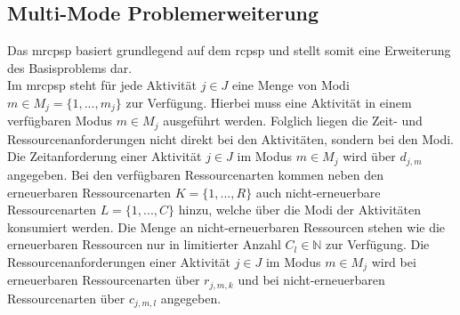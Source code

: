 \subsection{Multi-Mode Problemerweiterung} \label{subsec:MRCPSP_MM}

Das \ac{mrcpsp} basiert grundlegend auf dem \ac{rcpsp} und stellt somit eine Erweiterung des Basisproblems dar. \\


Im \ac{mrcpsp} steht für jede Aktivität $j \in J$ eine Menge von Modi $m \in M_j = \{ 1, ..., m_j \}$ zur Verfügung. Hierbei muss eine Aktivität in einem verfügbaren Modus $m \in M_j$ ausgeführt werden. Folglich liegen die Zeit- und Ressourcenanforderungen nicht  direkt bei den Aktivitäten, sondern bei den Modi. Die Zeitanforderung einer Aktivität $j \in J$ im Modus $m \in M_j$ wird über $d_{j,m}$ angegeben. Bei den verfügbaren Ressourcenarten kommen neben den erneuerbaren Ressourcenarten $K = \{1, ..., R\}$ auch nicht-erneuerbare Ressourcenarten $L = \{1, ..., C\}$ hinzu, welche über die Modi der Aktivitäten konsumiert werden. Die Menge an nicht-erneuerbaren Ressourcen stehen wie die erneuerbaren Ressourcen nur in limitierter Anzahl $C_l \in \mathbb{N}$ zur Verfügung. Die Ressourcenanforderungen einer Aktivität $j \in J$ im Modus $m \in M_j$ wird bei erneuerbaren Ressourcenarten über $r_{j,m,k}$ und bei nicht-erneuerbaren Ressourcenarten über $c_{j,m,l}$ angegeben. \cite[vgl.][S. 596 ff.]{wuliang_improved_2014} \\ 

